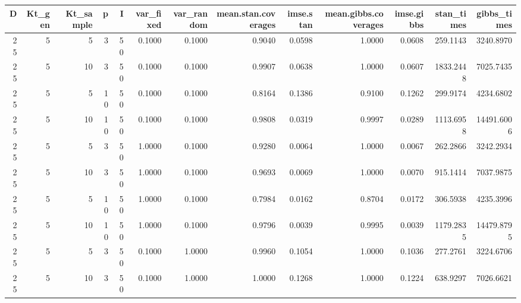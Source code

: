 \documentclass[AMA,Times1COL]{WileyNJDv5} %
\begin{document}
\begin{table}
    \centering
\begin{tabular}{rrrrrrrrrrrrr}
\toprule
D &  Kt\_gen &  Kt\_sample &  p &  I &  var\_fixed &  var\_random &  mean.stan.coverages &  imse.stan &  mean.gibbs.coverages &  imse.gibbs &  stan\_times &  gibbs\_times \\
\midrule
25 &       5 &          5 &  3 & 50 &     0.1000 &      0.1000 &               0.9040 &     0.0598 &                1.0000 &      0.0608 &    259.1143 &    3240.8970 \\
25 &       5 &         10 &  3 & 50 &     0.1000 &      0.1000 &               0.9907 &     0.0638 &                1.0000 &      0.0607 &   1833.2448 &    7025.7435 \\
25 &       5 &          5 & 10 & 50 &     0.1000 &      0.1000 &               0.8164 &     0.1386 &                0.9100 &      0.1262 &    299.9174 &    4234.6802 \\
25 &       5 &         10 & 10 & 50 &     0.1000 &      0.1000 &               0.9808 &     0.0319 &                0.9997 &      0.0289 &   1113.6958 &   14491.6006 \\
25 &       5 &          5 &  3 & 50 &     1.0000 &      0.1000 &               0.9280 &     0.0064 &                1.0000 &      0.0067 &    262.2866 &    3242.2934 \\
25 &       5 &         10 &  3 & 50 &     1.0000 &      0.1000 &               0.9693 &     0.0069 &                1.0000 &      0.0070 &    915.1414 &    7037.9875 \\
25 &       5 &          5 & 10 & 50 &     1.0000 &      0.1000 &               0.7984 &     0.0162 &                0.8704 &      0.0172 &    306.5938 &    4235.3996 \\
25 &       5 &         10 & 10 & 50 &     1.0000 &      0.1000 &               0.9796 &     0.0039 &                0.9995 &      0.0039 &   1179.2835 &   14479.8795 \\
25 &       5 &          5 &  3 & 50 &     0.1000 &      1.0000 &               0.9960 &     0.1054 &                1.0000 &      0.1036 &    277.2761 &    3224.6706 \\
25 &       5 &         10 &  3 & 50 &     0.1000 &      1.0000 &               1.0000 &     0.1268 &                1.0000 &      0.1224 &    638.9297 &    7026.6621 \\

\end{tabular}
\end{table}
\end{document}

